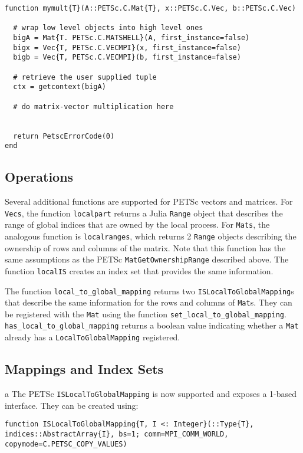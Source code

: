 \documentclass{article}
\begin{document}
\begin{verbatim}
function mymult{T}(A::PETSc.C.Mat{T}, x::PETSc.C.Vec, b::PETSc.C.Vec)

  # wrap low level objects into high level ones
  bigA = Mat{T. PETSc.C.MATSHELL}(A, first_instance=false)
  bigx = Vec{T, PETSc.C.VECMPI}(x, first_instance=false)
  bigb = Vec{T, PETSc.C.VECMPI}(b, first_instance=false)

  # retrieve the user supplied tuple
  ctx = getcontext(bigA)

  # do matrix-vector multiplication here
  

  return PetscErrorCode(0)
end
\end{verbatim}


\subsection{Operations}
Several additional functions are supported for PETSc vectors and matrices.
For \texttt{Vecs}, the function \texttt{localpart} returns a Julia \texttt{Range} object that describes the range of global indices that are owned by the 
local process.
For \texttt{Mats}, the analogous function is \texttt{localranges}, which 
returns 2 \texttt{Range} objects describing the ownership of rows and columns
of the matrix.  Note that this function has the same assumptions as the PETSc
\texttt{MatGetOwnershipRange} described above.
The function \texttt{localIS} creates an index set that provides the same 
information.

The function \texttt{local\_to\_global\_mapping} returns two 
\texttt{ISLocalToGlobalMapping}s that describe the same information for 
the rows and columns of \texttt{Mat}s.  They can be registered with the
\texttt{Mat} using the function \texttt{set\_local\_to\_global\_mapping}.
\texttt{has\_local\_to\_global\_mapping} returns a boolean value indicating
whether a \texttt{Mat} already has a \texttt{LocalToGlobalMapping} registered.

\subsection{Mappings and Index Sets} \label{sec:is}a
The PETSc \texttt{ISLocalToGlobalMapping} is now supported and exposes a 
1-based interface.
They can be created using:

\begin{verbatim}
function ISLocalToGlobalMapping{T, I <: Integer}(::Type{T}, indices::AbstractArray{I}, bs=1; comm=MPI_COMM_WORLD, copymode=C.PETSC_COPY_VALUES)
\end{verbatim}
\end{document}
